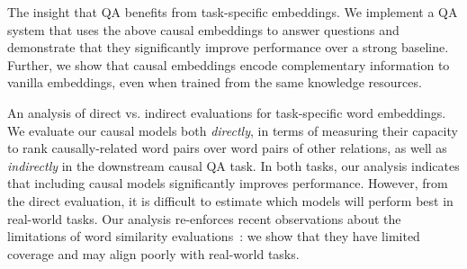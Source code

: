 {} The insight that QA benefits from task-specific embeddings. %
We implement a QA system that uses the above causal embeddings to answer questions and demonstrate that they significantly improve performance over a strong baseline. Further, we show that causal embeddings encode complementary information to vanilla embeddings, even when trained from the same knowledge resources. 

{} An analysis of direct vs. indirect evaluations for task-specific word embeddings. 
We evaluate our causal models both  {\em directly}, in terms of measuring their capacity to rank causally-related word pairs over word pairs of other relations, as well as {\em indirectly} in the downstream causal QA task. 
In both tasks, our analysis indicates that including causal models significantly improves performance. 
However, from the direct evaluation, it is difficult to estimate which models will perform best in real-world tasks. Our analysis re-enforces recent observations about the limitations of word similarity evaluations~\cite{faruqui2016problems}: we show that they have limited coverage and may align poorly with real-world tasks.




